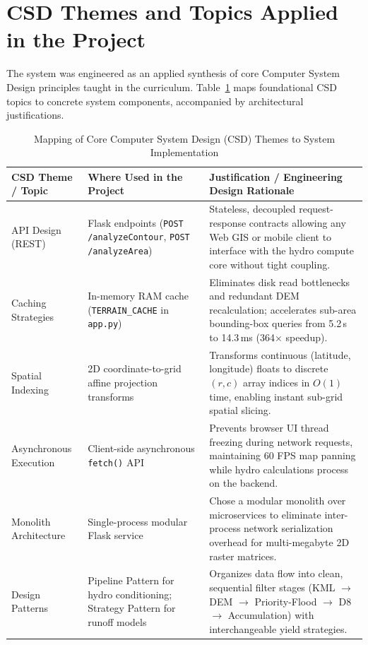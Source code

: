 \documentclass[manuscript,screen,review]{acmart}
\begin{document}
\section{CSD Themes and Topics Applied in the Project}
\label{sec:csd-themes}
The system was engineered as an applied synthesis of core Computer System Design principles taught in the curriculum. Table~\ref{tab:csd-themes} maps foundational CSD topics to concrete system components, accompanied by architectural justifications.

\begin{table}[htb]
  \caption{Mapping of Core Computer System Design (CSD) Themes to System Implementation}
  \label{tab:csd-themes}
  \footnotesize
  \renewcommand{\arraystretch}{0.90}
  \begin{tabular}{p{2.3cm}p{3.8cm}p{7.1cm}}
    \toprule
    CSD Theme / Topic & Where Used in the Project & Justification / Engineering Design Rationale \\
    \midrule
    API Design (REST) & Flask endpoints (\texttt{POST /analyzeContour}, \texttt{POST /analyzeArea}) & Stateless, decoupled request-response contracts allowing any Web GIS or mobile client to interface with the hydro compute core without tight coupling. \\
    Caching Strategies & In-memory RAM cache (\texttt{TERRAIN\_CACHE} in \texttt{app.py}) & Eliminates disk read bottlenecks and redundant DEM recalculation; accelerates sub-area bounding-box queries from 5.2\,s to 14.3\,ms (364$\times$ speedup). \\
    Spatial Indexing & 2D coordinate-to-grid affine projection transforms & Transforms continuous (latitude, longitude) floats to discrete $(r, c)$ array indices in $O(1)$ time, enabling instant sub-grid spatial slicing. \\
    Asynchronous Execution & Client-side asynchronous \texttt{fetch()} API & Prevents browser UI thread freezing during network requests, maintaining 60 FPS map panning while hydro calculations process on the backend. \\
    Monolith Architecture & Single-process modular Flask service & Chose a modular monolith over microservices to eliminate inter-process network serialization overhead for multi-megabyte 2D raster matrices. \\
    Design Patterns & Pipeline Pattern for hydro conditioning; Strategy Pattern for runoff models & Organizes data flow into clean, sequential filter stages (KML $\to$ DEM $\to$ Priority-Flood $\to$ D8 $\to$ Accumulation) with interchangeable yield strategies. \\

\end{tabular}
\end{table}
\end{document}
